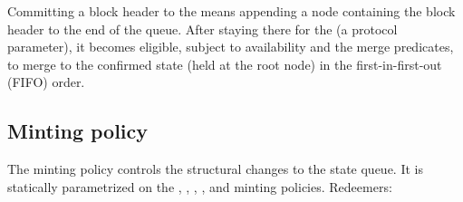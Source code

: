 \documentclass[../midgard.tex]{subfiles}
\begin{document}
Committing a block header to the  means appending a node containing the block header to the end of the queue.
After staying there for the  (a protocol parameter), it becomes eligible, subject to availability and the merge predicates, to merge to the confirmed state (held at the  root node) in the first-in-first-out (FIFO) order.

\subsection{Minting policy}
\label{h:state-queue-minting-policy}

The  minting policy controls the structural changes to the state queue.
It is statically parametrized on the , , , , and  minting policies.
Redeemers:
\end{document}
